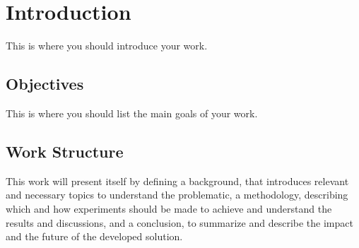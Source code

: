\chapter[Introduction]{Introduction}
This is where you should introduce your work.

\section{Objectives}
This is where you should list the main goals of your work.

\section{Work Structure}
This work will present itself by defining a background, that introduces relevant and necessary topics to understand the problematic, a methodology, describing which and how experiments should be made to achieve and understand the results and discussions, and a conclusion, to summarize and describe the impact and the future of the developed solution.

